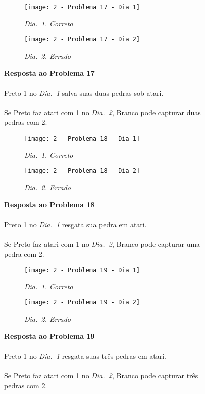 \vfill

\begin{SCfigure}[][h!]
    \begin{subfigure}[t]{.31\textwidth}
        \texttt{[image: 2 - Problema 17 - Dia 1]}
        \caption*{\emph{Dia.\@~1. Correto}}
    \end{subfigure}
    \hfill
    \begin{subfigure}[t]{.31\textwidth}
        \texttt{[image: 2 - Problema 17 - Dia 2]}
        \caption*{\emph{Dia.\@~2. Errado}}
    \end{subfigure}
    \hfill
    \caption*{\textbf{Resposta ao Problema 17}\\\\Preto 1 no \emph{Dia.\@~1} salva suas duas pedras sob atari.\\\\Se Preto faz atari com 1 no \emph{Dia.\@~2}, Branco pode capturar duas pedras com 2.}
\end{SCfigure}

\vfill

\begin{SCfigure}[][h!]
    \begin{subfigure}[t]{.31\textwidth}
        \texttt{[image: 2 - Problema 18 - Dia 1]}
        \caption*{\emph{Dia.\@~1. Correto}}
    \end{subfigure}
    \hfill
    \begin{subfigure}[t]{.31\textwidth}
        \texttt{[image: 2 - Problema 18 - Dia 2]}
        \caption*{\emph{Dia.\@~2. Errado}}
    \end{subfigure}
    \hfill
    \caption*{\textbf{Resposta ao Problema 18}\\\\Preto 1 no \emph{Dia.\@~1} resgata sua pedra em atari.\\\\Se Preto faz atari com 1 no \emph{Dia.\@~2}, Branco pode capturar uma pedra com 2.}
\end{SCfigure}

\pagebreak

\begin{SCfigure}[][h!]
    \begin{subfigure}[t]{.31\textwidth}
        \texttt{[image: 2 - Problema 19 - Dia 1]}
        \caption*{\emph{Dia.\@~1. Correto}}
    \end{subfigure}
    \hfill
    \begin{subfigure}[t]{.31\textwidth}
        \texttt{[image: 2 - Problema 19 - Dia 2]}
        \caption*{\emph{Dia.\@~2. Errado}}
    \end{subfigure}
    \hfill
    \caption*{\textbf{Resposta ao Problema 19}\\\\Preto 1 no \emph{Dia.\@~1} resgata suas três pedras em atari.\\\\Se Preto faz atari com 1 no \emph{Dia.\@~2}, Branco pode capturar três pedras com 2.}
\end{SCfigure}

